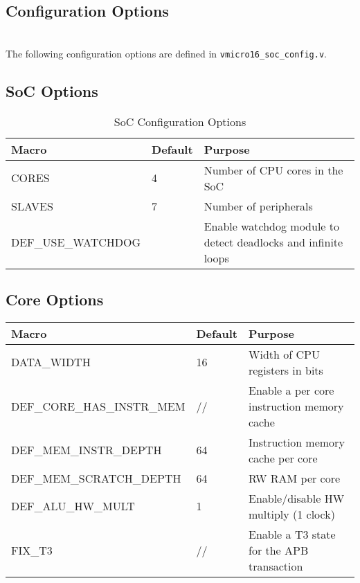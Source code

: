 \begin{appendices}
\startcontents[chapters]

\chapter{Configuration Options}
\label{sect:config}
\startcontents[chapters]

\noindent\\
The following configuration options are defined in \verb|vmicro16_soc_config.v|.

\section{SoC Options}
\begin{table}[H]
\centering
\label{tab:isa}
\begin{tabularx}{\textwidth}{l|l|p{8cm}}
Macro      & Default & Purpose                         \\ 
\hline
CORES  & 4       & Number of CPU cores in the SoC  \\
SLAVES & 7       & Number of peripherals  \\    
DEF\_USE\_WATCHDOG &  & Enable watchdog module to detect deadlocks and infinite loops \\    
\end{tabularx}
\caption{SoC Configuration Options}
\end{table}

\section{Core Options}
\begin{table}[H]
\centering
\begin{tabular}{l|l|p{8cm}}
Macro                      & Default & Purpose                                     \\ 
\hline
DATA\_WIDTH                & 16      & Width of CPU registers in bits              \\
DEF\_CORE\_HAS\_INSTR\_MEM & //      & Enable a per core instruction memory cache  \\
DEF\_MEM\_INSTR\_DEPTH     & 64      & Instruction memory cache per core           \\
DEF\_MEM\_SCRATCH\_DEPTH   & 64      & RW RAM per core                             \\
DEF\_ALU\_HW\_MULT        & 1       & Enable/disable HW multiply (1 clock)        \\
FIX\_T3                    & //      & Enable a T3 state for the APB transaction \\


\end{tabular}
\end{table}
\end{appendices}
